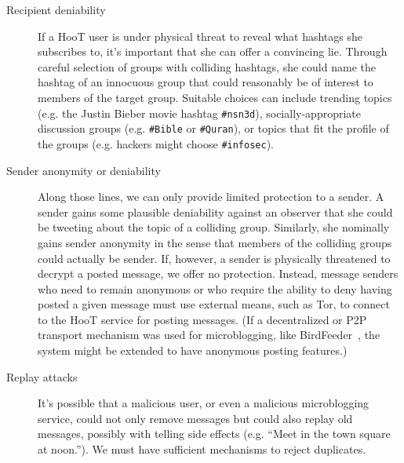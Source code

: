 \begin{description}
\item[Recipient deniability] If a HooT user is under physical threat to
  reveal what hashtags she subscribes to, it's important that she can
  offer a convincing lie. Through careful selection of groups with
  colliding hashtags, she could name the hashtag of an innocuous group
  that could reasonably be of interest to members of the target group.
  Suitable choices can include trending topics (e.g. the Justin Bieber
  movie hashtag {\tt \#nsn3d}), socially-appropriate discussion groups
  (e.g. {\tt \#Bible} or {\tt \#Quran}), or topics that fit the profile
  of the groups (e.g. hackers might choose {\tt \#infosec}).

\item[Sender anonymity or deniability] Along those lines, we can only
  provide limited protection to a sender. A sender gains some plausible
  deniability against an observer that she could be tweeting about the
  topic of a colliding group. Similarly, she nominally gains sender
  anonymity in the sense that members of the colliding groups could
  actually be sender. If, however, a sender is physically threatened to
  decrypt a posted message, we offer no protection.
Instead, message senders who need to remain anonymous or who require the
ability to deny having posted a given message must use external means,
such as Tor, to connect to the HooT service for posting messages. (If a
decentralized or P2P transport mechanism was used for microblogging,
like BirdFeeder~\cite{sandler08}, the system might be extended to have
anonymous posting features.)

\item[Replay attacks] It's possible that a malicious user, or even a
  malicious microblogging service, could not only remove messages but
  could also replay old messages, possibly with telling side effects
  (e.g. ``Meet in the town square at noon.''). We must have sufficient
  mechanisms to reject duplicates.


\end{description}
